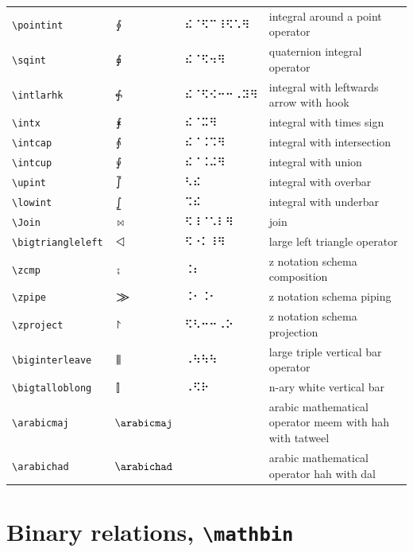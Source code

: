 \documentclass[oneside]{article}
\begin{document}
\begin{longtable}{llll}
\verb|\pointint| & $\pointint$ &  ⠮⠈⠫⠉⠸⠫⠡⠻  & {integral around a point operator} \\[2ex]
\verb|\sqint| & $\sqint$ &  ⠮⠈⠫⠲⠻  & {quaternion integral operator} \\[2ex]
\verb|\intlarhk| & $\intlarhk$ &  ⠮⠈⠫⠪⠒⠒⠠⠽⠻  & {integral with leftwards arrow with hook} \\[2ex]
\verb|\intx| & $\intx$ &  ⠮⠈⠭⠻  & {integral with times sign} \\[2ex]
\verb|\intcap| & $\intcap$ &  ⠮⠈⠨⠩⠻  & {integral with intersection} \\[2ex]
\verb|\intcup| & $\intcup$ &  ⠮⠈⠨⠬⠻  & {integral with union} \\[2ex]
\verb|\upint| & $\upint$ &  ⠣⠮  & {integral with overbar} \\[2ex]
\verb|\lowint| & $\lowint$ &  ⠩⠮  & {integral with underbar} \\[2ex]
\verb|\Join| & $\Join$ &  ⠫⠸⠈⠡⠇⠻  & {join} \\[2ex]
\verb|\bigtriangleleft| & $\bigtriangleleft$ &  ⠫⠐⠅⠸⠻  & {large left triangle operator} \\[2ex]
\verb|\zcmp| & $\zcmp$ &  ⠨⠆  & {z notation schema composition} \\[2ex]
\verb|\zpipe| & $\zpipe$ &  ⠨⠂⠨⠂  & {z notation schema piping} \\[2ex]
\verb|\zproject| & $\zproject$ &  ⠫⠣⠒⠒⠠⠕  & {z notation schema projection} \\[2ex]
\verb|\biginterleave| & $\biginterleave$ &  ⠠⠳⠳⠳  & {large triple vertical bar operator} \\[2ex]
\verb|\bigtalloblong| & $\bigtalloblong$ &  ⠠⠫⠗  & {n-ary white vertical bar} \\[2ex]
\verb|\arabicmaj| & $\arabicmaj$ &    & {arabic mathematical operator meem with hah with tatweel} \\[2ex]
\verb|\arabichad| & $\arabichad$ &    & {arabic mathematical operator hah with dal} \\[2ex]
\end{longtable}

\clearpage

\section{Binary relations, \texttt{\textbackslash{}mathbin}}
\end{document}
